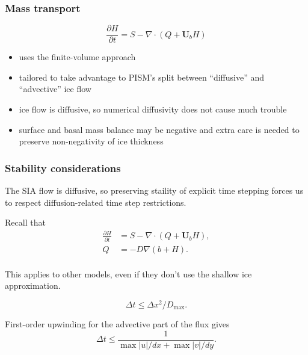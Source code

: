 \documentclass[hide notes,intlimits]{beamer}
\begin{document}
\begin{frame}
  \frametitle{Mass transport}

  \begin{equation*}
    \frac{\partial H}{\partial t} = S - \nabla \cdot (Q + \mathbf{U}_b H)
  \end{equation*}

  \begin{itemize}
  \item uses the finite-volume approach
  \item tailored to take advantage to PISM's split between
    ``diffusive'' and ``advective'' ice flow
  \item ice flow is diffusive, so numerical diffusivity does not cause
    much trouble
  \item surface and basal mass balance may be negative and extra care
    is needed to preserve non-negativity of ice thickness
  \end{itemize}
\end{frame}


\begin{frame}
  \frametitle{Stability considerations}

  The SIA flow is diffusive, so preserving staility of explicit time
  stepping forces us to respect diffusion-related time step
  restrictions.

  Recall that
  \begin{align}
    \label{eq:2}
    \frac{\partial H}{\partial t} &= S - \nabla \cdot (Q + \mathbf{U}_b H),\\
    Q &= -D \nabla (b + H).\\
  \end{align}

  This applies to other models, even if they don't use the shallow ice
  approximation.

  \begin{equation*}
    \label{eq:3}
    \Delta t \le \Delta x^{2} / D_{\text{max}}.
  \end{equation*}

  First-order upwinding for the advective part of the flux gives
  \begin{equation*}
    \label{eq:6}
    \Delta t \le \frac{1}{\max|u| / dx + \max|v| / dy}.
  \end{equation*}
\end{frame}
\end{document}

